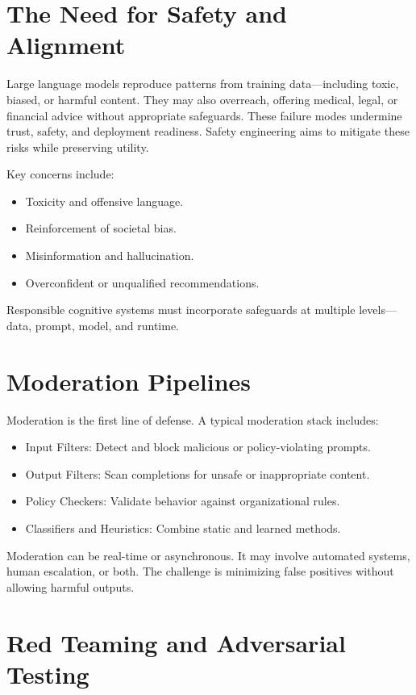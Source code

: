 \documentclass{book}
\begin{document}
\section{The Need for Safety and Alignment}

Large language models reproduce patterns from training data—including toxic, biased, or harmful content. They may also overreach, offering medical, legal, or financial advice without appropriate safeguards. These failure modes undermine trust, safety, and deployment readiness. Safety engineering aims to mitigate these risks while preserving utility.

Key concerns include:
\begin{itemize}
  \item Toxicity and offensive language.
  \item Reinforcement of societal bias.
  \item Misinformation and hallucination.
  \item Overconfident or unqualified recommendations.
\end{itemize}

Responsible cognitive systems must incorporate safeguards at multiple levels—data, prompt, model, and runtime.

\section{Moderation Pipelines}

Moderation is the first line of defense. A typical moderation stack includes:

\begin{itemize}
  \item Input Filters: Detect and block malicious or policy-violating prompts.
  \item Output Filters: Scan completions for unsafe or inappropriate content.
  \item Policy Checkers: Validate behavior against organizational rules.
  \item Classifiers and Heuristics: Combine static and learned methods.
\end{itemize}

Moderation can be real-time or asynchronous. It may involve automated systems, human escalation, or both. The challenge is minimizing false positives without allowing harmful outputs.

\section{Red Teaming and Adversarial Testing}
\end{document}

